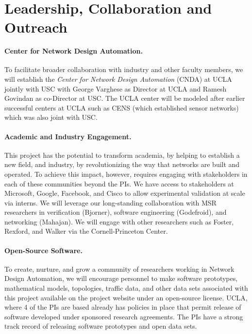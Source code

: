 \section{Leadership, Collaboration and Outreach}
\label{sec:organization}

\paragraph*{Center for Network Design Automation.}
%
To facilitate broader collaboration with industry and other faculty members, we will establish the {\em Center for Network Design Automation} (CNDA) at UCLA jointly with 
USC with George Varghese as Director at UCLA and Ramesh Govindan as 
co-Director at USC. The UCLA center will be modeled after earlier successful centers at UCLA such as CENS (which established sensor networks) which was also 
joint with USC. 

\paragraph*{Academic and Industry Engagement.}
%
This project has the potential to transform academia, by helping to establish a new field, and industry, by revolutionizing the way that networks are built and operated. To achieve this impact, however, requires engaging with stakeholders in each of these communities beyond the PIs.  We have access to stakeholders at Microsoft, Google, Facebook, and Cisco to allow experimental validation at scale via interns. We will leverage our long-standing collaboration with MSR researchers in verification (Bjorner), software engineering (Godefroid), and networking (Mahajan).  We will engage with other researchers such as Foster, Rexford, and Walker via the Cornell-Princeton Center.

\paragraph*{Open-Source Software.}
%
To create, nurture, and grow a community of researchers working in Network Design Automation, we will encourage personnel to make software prototypes, mathematical models, topologies, traffic data, and other data sets associated with this project available on the project website under an open-source license. UCLA, where 4 of the PIs are based already has policies in place that permit release of software developed under sponsored research agreements. The PIs have a strong track record of releasing software prototypes and open data sets. 

